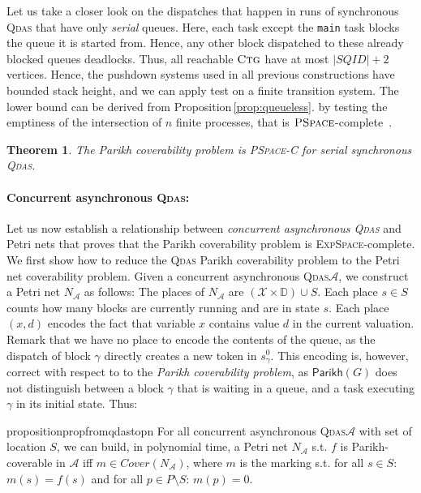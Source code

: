 \documentclass[runningheads,oribibl,]{article}
\newcommand{\Aa}{\ensuremath{\mathcal{A}}\xspace}
\newcommand{\Xx}{\ensuremath{\mathcal{X}}\xspace}
\newcommand{\DD}{\ensuremath{\mathbb{D}}\xspace}
\newcommand{\qdas}{\textsc{Qdas}\xspace}
\newcommand{\dexpspace}{\textsc{ExpSpace}\xspace}
\newcommand{\pspace}{\textsc{PSpace}\xspace}
\newcommand{\pspacecomplete}{\textsc{PSpace-C}\xspace}
\newcommand{\Cover}{\ensuremath{\textit{Cover}}}
\newcommand{\ctg}{\ensuremath{\textsc{Ctg}}\xspace}
\newcommand{\Parikh}{\ensuremath{\mathsf{Parikh}}}
\newtheorem{theorem}{Theorem}{}
\begin{document}
Let us take a closer look on the dispatches that happen in runs of
synchronous \qdas that have only \emph{serial} queues.
Here, each task except the \texttt{main} task blocks the queue it is
started
from. Hence, any other block dispatched to these already blocked
queues deadlocks. Thus, all reachable \ctg have at most
$\vert SQID\vert +2$ vertices. Hence, the pushdown systems used in
all previous constructions have bounded stack height, and we can
apply test on a finite transition system.
 The lower bound can be
derived from Proposition\,\ref{prop:queueless}.
by testing the emptiness of the intersection
of $n$ finite processes, that is $\pspace$-complete~\cite{kozen-d-1977-254-a}.


\begin{theorem}\label{thm:serialsyncqdas}
  The Parikh coverability problem is \pspacecomplete for serial
  synchronous \qdas.
\end{theorem}

\paragraph{\bf Concurrent asynchronous \qdas:}


Let us now establish a relationship between \emph{concurrent
asynchronous {\qdas}} and Petri nets that proves that the Parikh
coverability problem is \dexpspace-complete. We first show how to
reduce the \qdas Parikh coverability problem to the Petri net
coverability problem.
                    Given a concurrent asynchronous \qdas $\Aa$, we construct a Petri net $N_\Aa$ as
follows: The places of $N_\Aa$ are $(\Xx\times\DD)\cup S$.
Each place $s\in S$  counts how many blocks are currently running and are in state $s$. Each
place $(x,d)$ encodes the fact that variable $x$ contains value $d$ in
the current valuation.  Remark that we have no place to encode the
contents of the queue, as the dispatch of block $\gamma$ directly
creates a new token in $s^0_\gamma$. This encoding is, however,
correct with respect to to the \emph{Parikh coverability problem}, as $\Parikh(G)$
does not distinguish between a block $\gamma$ that is waiting in a
queue, and a task executing $\gamma$ in its initial state. Thus:


\begin{restatable}{proposition}{propfromqdastopn}
  \label{prop:from-qdas-to-pn}
  For all concurrent asynchronous \qdas $\Aa$ with set of location
  $S$, we can build, in polynomial time, a Petri net $N_\Aa$ s.t. $f$ is
  Parikh-coverable in $\Aa$ iff $m\in\Cover(N_\Aa)$, where $m$ is the
  marking s.t. for all $s\in S$: $m(s)=f(s)$ and for all $p\in
  P\setminus S$: $m(p)=0$.
\end{restatable}
\end{document}
